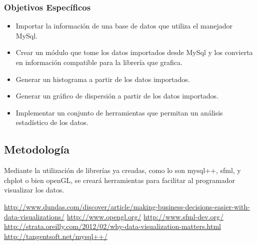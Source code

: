 \documentclass[11pt]{article}
\begin{document}
\subsubsection*{Objetivos Específicos}
\begin{itemize}
\item Importar la información de una base de datos que utiliza el manejador MySql.
\item Crear un módulo que tome los datos importados desde MySql y los convierta en información compatible para la librería que grafica.
\item Generar un histograma a partir de los datos importados.
\item Generar un gráfico de dispersión a partir de los datos importados.
\item Implementar un conjunto de herramientas que permitan un análisis estadístico de los datos.
\end{itemize}
\subsection*{Metodología}
Mediante la utilización de librerías ya creadas, como lo son mysql++, sfml, y chplot o bien openGL, se creará herramientas para facilitar al programador visualizar los datos.
\begin{thebibliography}{10}
\url{http://www.dundas.com/discover/article/making-business-decisions-easier-with-data-visualizations/}
\url{http://www.opengl.org/}
\url{http://www.sfml-dev.org/}
\url{http://strata.oreilly.com/2012/02/why-data-visualization-matters.html}
\url{http://tangentsoft.net/mysql++/}
\end{thebibliography}
\end{document}
